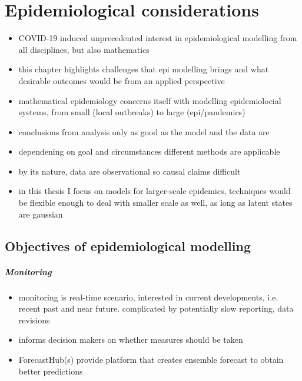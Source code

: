 \glsresetall
\chapter{Epidemiological considerations}
\label{chap:epidemiological_considerations}

\begin{itemize}
    \item COVID-19 induced unprecedented interest in epidemiological modelling from all disciplines, but also mathematics
    \item this chapter highlights challenges that epi modelling brings and what desirable outcomes would be from an applied perspective
    \item mathematical epidemiology concerns itself with modelling epidemiolocial systems, from small (local outbreaks) to large (epi/pandemics)
    \item conclusions from analysis only as good as the model and the data are
    \item dependening on goal and circumstances different methods are applicable
    \item by its nature, data are observational so causal claims difficult
    \item in this thesis I focus on models for larger-scale epidemics, techniques would be flexible enough to deal with smaller scale as well, as long as latent states are gaussian
\end{itemize}
\section{Objectives of epidemiological modelling}

\paragraph{Monitoring}
\begin{itemize}
    \item monitoring is real-time scenario, interested in current developments, i.e. recent past and near future. complicated by potentially slow reporting, data revisions
    \item informs decision makers on whether measures should be taken
    \item ForecastHub(s) provide platform that creates ensemble forecast to obtain better predictions \cite{Bracher2022National,Bracher2021Preregistered,Ray2020Ensemble,Sherratt2022Predictive}
\end{itemize}
